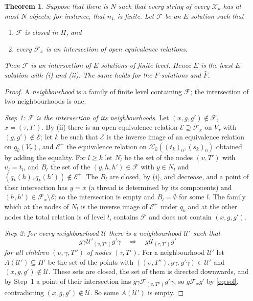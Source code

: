 \documentclass[11pt]{amsart}
\newtheorem{thm}{Theorem}[section]
\theoremstyle{definition}
\newcommand{\cX}{\mathcal X}
\begin{document}
\begin{thm}\label{thm:closed}
Suppose that there is $N$ such that every string of every $\cX_k$ has
at most $N$ objects; for instance, that $n_L$ is finite. Let
$\mathcal F$ be an $E$-solution such that
\begin{enumerate}
\item[(i)] $\mathcal F$ is closed in $\Pi$, and
\item[(ii)] every $\mathcal F_x$ is an intersection of open
equivalence relations.
\end{enumerate}
Then $\mathcal F$ is an intersection of $E$-solutions of finite
level. Hence $\bar E$ is the least $E$-solution with \emph{(i)} and
\emph{(ii)}. The same holds for the $F$-solutions and $\bar F$.
\end{thm}
\begin{proof}
A \emph{neighbourhood} is a family of finite level containing
$\mathcal F$; the intersection of two neighbourhoods is one.

\emph{Step 1: $\mathcal F$ is the intersection of its neighbourhoods.}
Let $(x,g,g')\notin\mathcal F$, $x=(\tau,T')$. By (ii) there is an
open equivalence relation $\mathcal E\supseteq\mathcal F_x$ on
$V_\tau$ with $(g,g')\notin\mathcal E$; let $k$ be such that
$\mathcal E$ is the inverse image of an equivalence relation on
$q_k(V_\tau)$, and $\mathcal E^+$ the equivalence relation on
$\cX_k((t_k)_0,(s_k)_0)$ obtained by adding the equality. For $l\ge
k$ let $N_l$ be the set of the nodes $(\upsilon,T')$ with $u_l=t_l$,
and $B_l$ the set of the $(y,h,h')\in\mathcal F$ with $y\in N_l$ and
$(q_k(h),q_k(h'))\notin\mathcal E^+$. The $B_l$ are closed, by (i),
and decrease, and a point of their intersection has $y=x$ (a thread
is determined by its components) and $(h,h')\in\mathcal
F_x\setminus\mathcal E$; so the intersection is empty and
$B_l=\emptyset$ for some $l$. The family which at the nodes of $N_l$
is the inverse image of $\mathcal E^+$ under $q_k$ and at the other
nodes the total relation is of level $l$, contains $\mathcal F$ and
does not contain $(x,g,g')$.

\emph{Step 2: for every neighbourhood $\mathcal U$ there is a
neighbourhood $\mathcal U'$ such that
\begin{equation}\label{eq:S}
g\gamma\mathrel{\mathcal U'_{(\upsilon,T'')}}g'\gamma\quad
\Longrightarrow\quad g\mathrel{\mathcal U_{(\tau,T')}}g'
\end{equation}
for all children $(\upsilon,\gamma,T'')$ of nodes $(\tau,T')$.} For a
neighbourhood $\mathcal U'$ let $A(\mathcal U')\subseteq\Pi'$ be the
set of the points with $((\upsilon,T''),g\gamma,g'\gamma)\in\mathcal
U'$ and $(x,g,g')\notin\mathcal U$. These sets are closed, the set of
them is directed downwards, and by Step~1 a point of their
intersection has $g\gamma\mathrel{\mathcal F_{(\upsilon,T'')}}
g'\gamma$, so $g\mathrel{\mathcal F_x}g'$ by \eqref{eq:sol},
contradicting $(x,g,g')\notin\mathcal U$. So some $A(\mathcal U')$ is
empty.


\end{proof}
\end{document}
